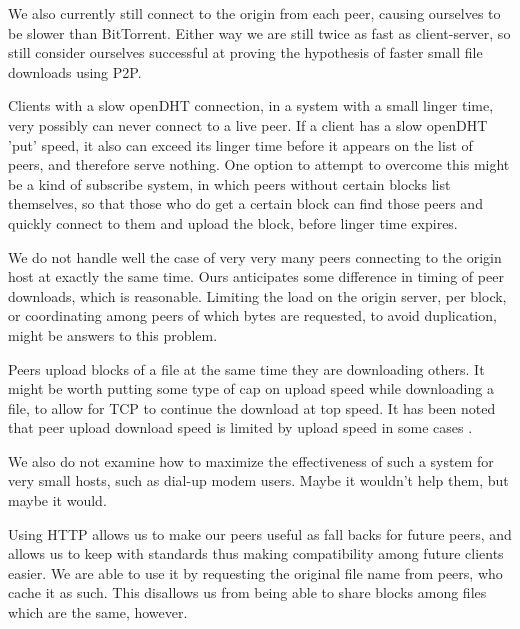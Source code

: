 We also currently still connect to the origin from each peer, causing ourselves to be slower than BitTorrent.  Either way we are still twice as fast as client-server, so still consider ourselves successful at proving the hypothesis of faster small file downloads using P2P.

Clients with a slow openDHT connection, in a system with a small linger time, very possibly can never connect to a live peer.  If a client has a slow openDHT 'put' speed, it also can exceed its linger time before it appears on the list of peers, and therefore serve nothing.  One option to attempt to overcome this might be a kind of subscribe system, in which peers without certain blocks list themselves, so that those who do get a certain block can find those peers and quickly connect to them and upload the block, before linger time expires. 

We do not handle well the case of very very many peers connecting to the origin host at exactly the same time.  Ours anticipates some difference in timing of peer downloads, which is reasonable. Limiting the load on the origin server, per block, or coordinating among peers of which bytes are requested, to avoid duplication, might be answers to this problem.

Peers upload blocks of a file at the same time they are downloading others.  It might be worth putting some type of cap on upload speed while downloading a file, to allow for TCP to continue the download at top speed.  It has been noted that peer upload download speed is limited by upload speed in some cases \cite{google_note}.

We also do not examine how to maximize the effectiveness of such a system for very small hosts, such as dial-up modem users.  Maybe it wouldn't help them, but maybe it would.


Using HTTP allows us to make our peers useful as fall backs for future peers, and allows us to keep with standards thus making compatibility among future clients easier.  We are able to use it by requesting the original file name from peers, who cache it as such.  This disallows us from being able to share blocks among files which are the same, however.

